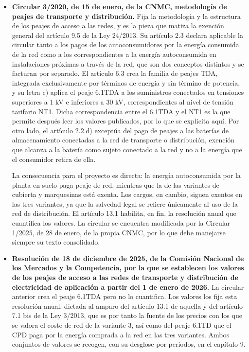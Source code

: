 \begin{itemize}
    \item \textbf{Circular 3/2020, de 15 de enero, de la \ac{CNMC}, metodología de peajes de transporte y distribución.} Fija la metodología y la estructura de los peajes de acceso a las redes, y es la pieza que matiza la exención general del artículo 9.5 de la Ley 24/2013. Su artículo 2.3 declara aplicable la circular tanto a los pagos de los autoconsumidores por la energía consumida de la red como a los correspondientes a la energía autoconsumida en instalaciones próximas a través de la red, que son dos conceptos distintos y se facturan por separado. El artículo 6.3 crea la familia de peajes TDA, integrada exclusivamente por términos de energía y sin término de potencia, y su letra c) aplica el peaje 6.1TDA a los suministros conectados en tensiones superiores a 1 kV e inferiores a 30 kV, correspondientes al nivel de tensión tarifario NT1. Dicha correspondencia entre el 6.1TDA y el NT1 es la que permite después leer los valores publicados, por lo que se explicita aquí. Por otro lado, el artículo 2.2.d) exceptúa del pago de peajes a las baterías de almacenamiento conectadas a la red de transporte o distribución, exención que alcanza a la batería como sujeto conectado a la red y no a la energía que el consumidor retira de ella.

    La consecuencia para el proyecto es directa: la energía autoconsumida por la planta en suelo paga peaje de red, mientras que la de las variantes de cubierta y marquesinas está exenta. Los cargos, en cambio, siguen exentos en las tres variantes, ya que la salvedad legal se refiere únicamente al uso de la red de distribución. El artículo 13.1 habilita, en fin, la resolución anual que cuantifica los valores. La circular se encuentra modificada por la Circular 1/2025, de 28 de enero, de la propia \ac{CNMC}, por lo que debe manejarse siempre su texto consolidado.

    \item \textbf{Resolución de 18 de diciembre de 2025, de la Comisión Nacional de los Mercados y la Competencia, por la que se establecen los valores de los peajes de acceso a las redes de transporte y distribución de electricidad de aplicación a partir del 1 de enero de 2026.} La circular anterior crea el peaje 6.1TDA pero no lo cuantifica. Los valores los fija esta resolución anual, dictada al amparo del artículo 13.1 de aquella y del artículo 7.1 bis de la Ley 3/2013, que es por tanto la fuente de los precios con los que se valora el coste de red de la variante 3, así como del peaje 6.1TD que el \ac{CPD} paga por la energía comprada a la red en las tres variantes. Ambos conjuntos de valores se recogen, con su desglose por periodos, en el capítulo 9.


\end{itemize}
